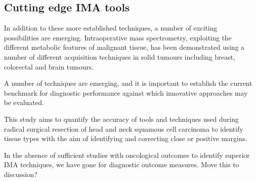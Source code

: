 \subsection{Cutting edge IMA tools}
In addition to these more established techniques, a number of exciting possibilities are emerging. 
Intraoperative mass spectrometry, exploiting the different metabolic features of malignant tissue, has been demonstrated using a number of different acquisition techniques in solid tumours including breast, colorectal and brain tumours.

A number of techniques are emerging, and it is important to establish the current benchmark for diagnostic performance against which innovative approaches may be evaluated.

This study aims to quantify the accuracy of tools and techniques used during radical surgical resection of head and neck squamous cell carcinoma to identify tissue types with the aim of identifying and correcting close or positive margins.

In the absence of sufficient studies with oncological outcomes to identify superior IMA techniques, we have gone for diagnostic outcome measures. Move this to discussion?
